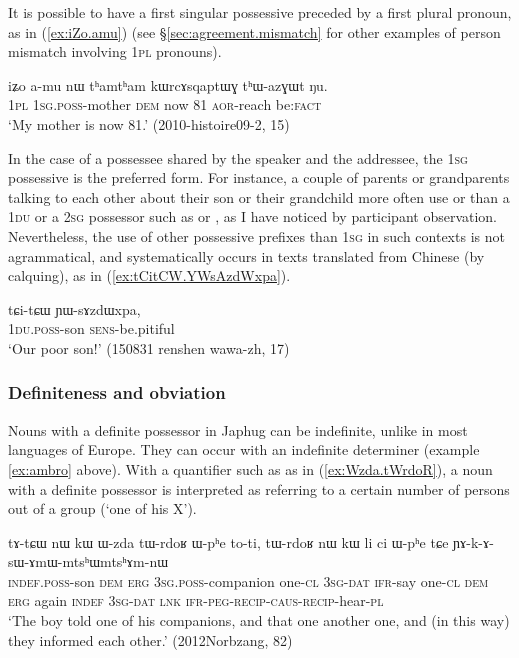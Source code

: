 It is possible to have a first singular possessive preceded by a first plural pronoun, as in (\ref{ex:iZo.amu}) (see §\ref{sec:agreement.mismatch} for other examples of person mismatch involving \textsc{1pl} pronouns).

\begin{exe}
\ex \label{ex:iZo.amu}
\gll iʑo a-mu nɯ tʰamtʰam kɯrcɤsqaptɯɣ tʰɯ-azɣɯt ŋu. \\
\textsc{1pl} \textsc{1sg}.\textsc{poss}-mother \textsc{dem} now 81 \textsc{aor}-reach  be:\textsc{fact} \\
\glt `My mother is now 81.' (2010-histoire09-2, 15)
\end{exe}

In the case of a possessee shared by the speaker and the addressee, the \textsc{1sg} possessive is the preferred form. For instance, a couple of parents or grandparents talking to each other about their son or their grandchild more often use  or  than a \textsc{1du} or a \textsc{2sg} possessor such as  or , as I have noticed by participant observation. Nevertheless, the use of other possessive prefixes than \textsc{1sg} in such contexts is not agrammatical, and systematically occurs in texts translated from Chinese (by calquing), as in (\ref{ex:tCitCW.YWsAzdWxpa}). 

\begin{exe}
\ex \label{ex:tCitCW.YWsAzdWxpa}
\gll tɕi-tɕɯ ɲɯ-sɤzdɯxpa,  \\
\textsc{1du}.\textsc{poss}-son \textsc{sens}-be.pitiful \\
\glt `Our poor son!' (150831 renshen wawa-zh, 17)
\end{exe}

 

\subsubsection{Definiteness and obviation} \label{sec:possessive.prefix.obv.def}
Nouns with a definite possessor in Japhug can be indefinite, unlike in most languages of Europe. They can occur with an indefinite determiner (example \ref{ex:ambro}  above). With a quantifier such as  as in (\ref{ex:Wzda.tWrdoR}), a noun with a definite possessor is interpreted as referring to a certain number of persons out of a group (`one of his X').

 \begin{exe}
\ex \label{ex:Wzda.tWrdoR}
\gll tɤ-tɕɯ nɯ kɯ ɯ-zda tɯ-rdoʁ ɯ-pʰe to-ti, tɯ-rdoʁ nɯ kɯ li ci ɯ-pʰe tɕe ɲɤ-k-ɤ-sɯ-ɤmɯ-mtsʰɯ\redp{}mtsʰɤm-nɯ \\
\textsc{indef}.\textsc{poss}-son \textsc{dem} \textsc{erg} \textsc{3sg}.\textsc{poss}-companion one-\textsc{cl} \textsc{3sg}-\textsc{dat} \textsc{ifr}-say one-\textsc{cl}  \textsc{dem} \textsc{erg} again \textsc{indef} \textsc{3sg}-\textsc{dat} \textsc{lnk}   \textsc{ifr}-\textsc{peg}-\textsc{recip}-\textsc{caus}-\textsc{recip}-hear-\textsc{pl} \\
\glt `The boy told one of his companions, and that one another one, and (in this way) they informed each other.' (2012Norbzang, 82)
\end{exe}

